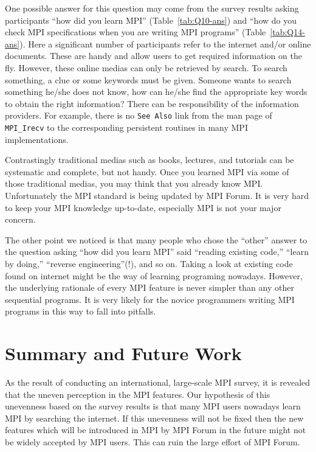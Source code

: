 \documentclass[sigconf,nonacm]{acmart}
\begin{document}
One possible answer for this question may come from the survey results
asking participants ``how did you learn MPI''
(Table~\ref{tab:Q10-ans}) and ``how do you check
MPI specifications when you are writing MPI programs''
(Table~\ref{tab:Q14-ans}). 
Here a significant number of participants refer to the internet
and/or online documents. These are handy and allow users to get
required information on the fly. However, 
these online medias can only be retrieved by
search. To search something, a clue or some keywords must be given. 
Someone wants to search something he/she does not know, how can he/she
find the appropriate key words to obtain the right information? 
There can be responsibility of the information providers. For example,
there is no {\tt See Also} link from the man page of {\tt MPI\_Irecv}
to the corresponding persistent routines in many MPI implementations. 

Contrastingly traditional medias such as books, lectures, and tutorials can be
systematic and complete, but not handy.  Once you learned MPI via some
of those traditional medias, you may think that you already know
MPI. Unfortunately the MPI standard is being updated by MPI Forum. It is
very hard to keep your MPI knowledge up-to-date, especially MPI is not
your major concern. 

The other point we noticed is that many people who chose the ``other''
answer to the question asking ``how did you learn MPI'' said
``reading existing code,'' ``learn by doing,'' ``reverse
engineering''(!),  and so on. Taking a look at existing code found on
internet might be the way of learning programing nowadays. However,
the underlying rationale of every MPI feature is never simpler than
any other sequential programs. It is very likely for the novice
programmers writing MPI programs in this way to fall into pitfalls. 

\section{Summary and Future Work}

As the result of conducting an international, large-scale MPI survey,
it is revealed that the uneven perception in the MPI features. Our
hypothesis of this unevenness based on the survey results is that many 
MPI users nowadays learn MPI by searching the internet. If this
unevenness will not be fixed then the new features which will be
introduced in MPI by MPI Forum in the future might not be
widely accepted by MPI users. This can ruin the large effort of MPI
Forum. 
\end{document}
